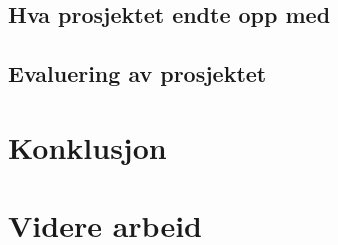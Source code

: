 \section{Hva prosjektet endte opp med}

	

\section{Evaluering av prosjektet}

	

\chapter{Konklusjon}

	

\chapter{Videre arbeid}

	